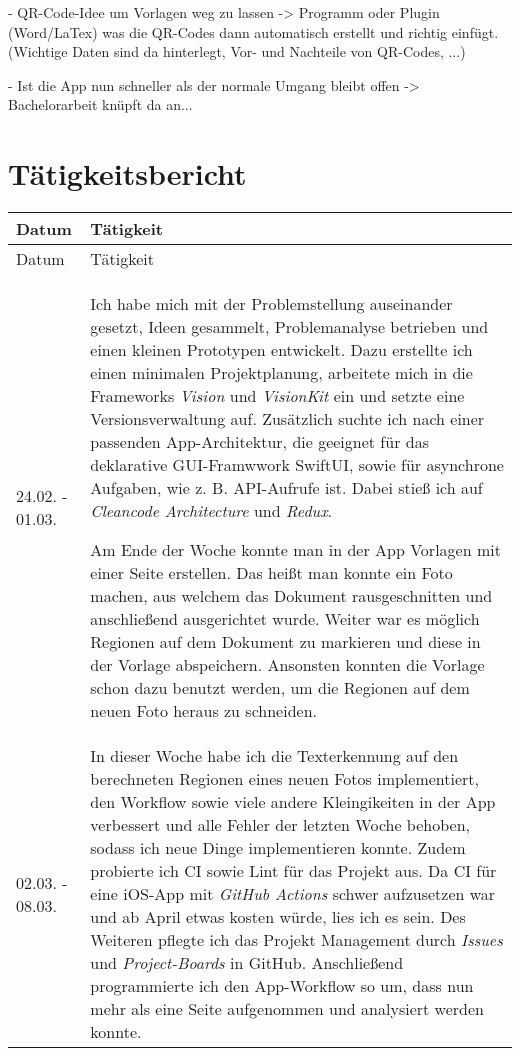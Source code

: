 \documentclass[nomenclature, 150]{HSMW-Thesis}
\begin{document}
	- QR-Code-Idee um Vorlagen weg zu lassen -> Programm oder Plugin (Word/LaTex) was die QR-Codes dann automatisch erstellt und richtig einfügt. (Wichtige Daten sind da hinterlegt, Vor- und Nachteile von QR-Codes, ...)
	
	- Ist die App nun schneller als der normale Umgang bleibt offen -> Bachelorarbeit knüpft da an...
	

\Anhang

\chapter{Tätigkeitsbericht}
	\begin{longtable}[h!]{ p{4em} | p{356pt} }
		Datum & Tätigkeit \\ \hline
		\endfirsthead
		Datum & Tätigkeit \\ \hline
 		\endhead

 		\hline
 		\endfoot
		
		24.02. - 01.03. & 
			Ich habe mich mit der Problemstellung auseinander gesetzt, Ideen gesammelt, Problemanalyse betrieben und einen kleinen Prototypen entwickelt. Dazu erstellte ich einen minimalen Projektplanung, arbeitete mich in die Frameworks \textit{Vision} und \textit{VisionKit} ein und setzte eine Versionsverwaltung auf. Zusätzlich suchte ich nach einer passenden App-Architektur, die geeignet für das deklarative GUI-Framwwork SwiftUI, sowie für asynchrone Aufgaben, wie z. B. API-Aufrufe ist. Dabei stieß ich auf \textit{Cleancode Architecture} und \textit{Redux}.
				
			Am Ende der Woche konnte man in der App Vorlagen mit einer Seite erstellen. Das heißt man konnte ein Foto machen, aus welchem das Dokument rausgeschnitten und anschließend ausgerichtet wurde. Weiter war es möglich Regionen auf dem Dokument zu markieren und diese in der Vorlage abspeichern. Ansonsten konnten die Vorlage schon dazu benutzt werden, um die Regionen auf dem neuen Foto heraus zu schneiden.
			\\ \hline
		02.03. - 08.03. &
			In dieser Woche habe ich die Texterkennung auf den berechneten Regionen eines neuen Fotos implementiert, den Workflow sowie viele andere Kleingikeiten in der App verbessert und alle Fehler der letzten Woche behoben, sodass ich neue Dinge implementieren konnte. Zudem probierte ich CI sowie Lint für das Projekt aus. Da CI für eine iOS-App mit \textit{GitHub Actions} schwer aufzusetzen war und ab April etwas kosten würde, lies ich es sein. Des Weiteren pflegte ich das Projekt Management durch \textit{Issues} und \textit{Project-Boards} in GitHub. Anschließend programmierte ich den App-Workflow so um, dass nun mehr als eine Seite aufgenommen und analysiert werden konnte. 
				

\end{longtable}
\end{document}
